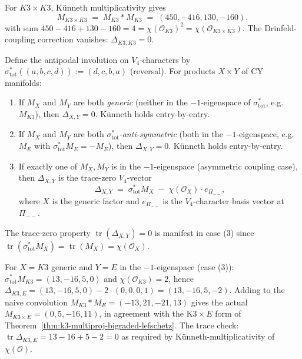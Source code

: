 \begin{proposition}
\label{prop:k3-k3-via-kunneth}
For $K3 \times K3$, Künneth multiplicativity gives
\[
 M_{K3 \times K3} \;=\; M_{K3} * M_{K3} \;=\; (450, -416, 130, -160),
\]
with sum $450 - 416 + 130 - 160 = 4 = \chi(\mathcal{O}_{K3})^2
= \chi(\mathcal{O}_{K3 \times K3})$. The Drinfeld-coupling correction
vanishes: $\Delta_{K3, K3} = 0$.
\end{proposition}

\begin{theorem}
\label{thm:kunneth-dichotomy}
Define the antipodal involution on $V_4$-characters by
$\sigma_{\mathrm{tot}}^*((a, b, c, d)) := (d, c, b, a)$
\textup{(}reversal\textup{).} For products $X \times Y$ of
CY manifolds:
\begin{enumerate}
\item If $M_X$ and $M_Y$ are both \emph{generic}
 \textup{(}neither in the $-1$-eigenspace of
 $\sigma_{\mathrm{tot}}^*$, e.g.\ $M_{K3}$\textup{)}, then
 $\Delta_{X, Y} = 0$. Künneth holds entry-by-entry.
\item If $M_X$ and $M_Y$ are both \emph{$\sigma_{\mathrm{tot}}^*$-anti-symmetric}
 \textup{(}both in the $-1$-eigenspace, e.g.\ $M_E$ with
 $\sigma_{\mathrm{tot}}^* M_E = -M_E$\textup{)}, then
 $\Delta_{X, Y} = 0$. Künneth holds entry-by-entry.
\item If exactly one of $M_X, M_Y$ is in the $-1$-eigenspace
 \textup{(}asymmetric coupling case\textup{)}, then
 $\Delta_{X, Y}$ is the trace-zero $V_4$-vector
 \[
 \Delta_{X, Y}
 \;=\; \sigma_{\mathrm{tot}}^* M_X
 \;-\; \chi(\mathcal{O}_X) \cdot e_{\Pi_{--}},
 \]
 where $X$ is the generic factor and $e_{\Pi_{--}}$ is the
 $V_4$-character basis vector at $\Pi_{--}$.
\end{enumerate}
The trace-zero property $\operatorname{tr}(\Delta_{X, Y}) = 0$ is
manifest in case (3) since
$\operatorname{tr}(\sigma_{\mathrm{tot}}^* M_X)
= \operatorname{tr}(M_X) = \chi(\mathcal{O}_X)$.
\end{theorem}

\begin{remark}
\label{rem:k3-times-e-verification}
For $X = K3$ generic and $Y = E$ in the $-1$-eigenspace
\textup{(}case (3)\textup{):}
$\sigma_{\mathrm{tot}}^* M_{K3} = (13, -16, 5, 0)$ and
$\chi(\mathcal{O}_{K3}) = 2$, hence
$\Delta_{K3, E} = (13, -16, 5, 0) - 2 \cdot (0, 0, 0, 1)
= (13, -16, 5, -2)$. Adding to the naive convolution
$M_{K3} * M_E = (-13, 21, -21, 13)$ gives the actual
$M_{K3 \times E} = (0, 5, -16, 11)$, in agreement with the K$3 \times E$
form of Theorem~\ref{thm:k3-multiproj-bigraded-lefschetz}. The
trace check: $\operatorname{tr}\Delta_{K3, E} = 13 - 16 + 5 - 2 = 0$
as required by Künneth-multiplicativity of $\chi(\mathcal{O})$.
\end{remark}

